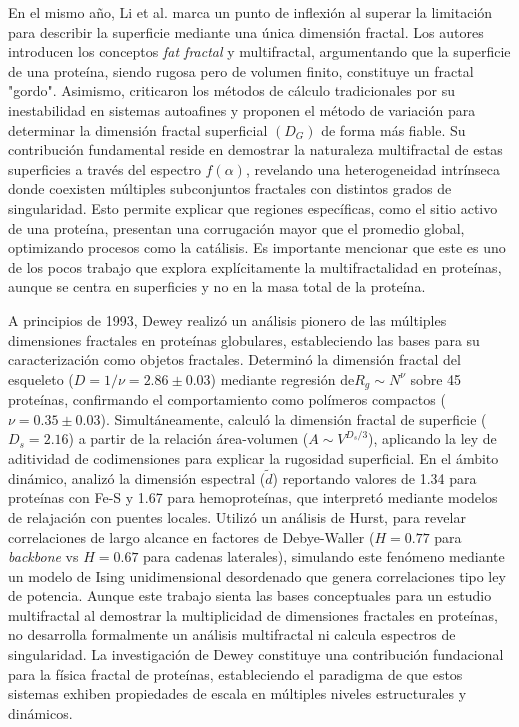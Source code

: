 En el mismo año, Li et al. \cite{HouqiangLi1991} marca un punto de inflexi\'{o}n al superar la limitaci\'{o}n para describir la superficie mediante una \'{u}nica dimensi\'{o}n fractal. Los autores introducen los conceptos \textit{fat fractal} y multifractal, argumentando que la superficie de una prote\'{i}na, siendo rugosa pero de volumen finito, constituye un fractal "gordo". Asimismo, criticaron los m\'{e}todos de c\'{a}lculo tradicionales por su inestabilidad en sistemas autoafines y proponen el m\'{e}todo de variaci\'{o}n para determinar la dimensi\'{o}n fractal superficial $(D_G)$ de forma m\'{a}s fiable. Su contribuci\'{o}n fundamental reside en demostrar la naturaleza multifractal de estas superficies a trav\'{e}s del espectro $f(\alpha)$, revelando una heterogeneidad intr\'{i}nseca donde coexisten m\'{u}ltiples subconjuntos fractales con distintos grados de singularidad. Esto permite explicar que regiones espec\'{i}ficas, como el sitio activo de una proteína, presentan una corrugaci\'{o}n mayor que el promedio global, optimizando procesos como la cat\'{a}lisis. Es importante mencionar que este es uno de los pocos trabajo que explora explícitamente la multifractalidad en proteínas, aunque se centra en superficies y no en la masa total de la proteína.


A principios de 1993, Dewey \cite{Dewey1993} realizó un análisis pionero de las múltiples dimensiones fractales en proteínas globulares, estableciendo las bases para su caracterización como objetos fractales. Determinó la dimensión fractal del esqueleto ($D = 1/\nu = 2.86 \pm 0.03$) mediante regresión de$R_g \sim N^\nu$ sobre 45 proteínas, confirmando el comportamiento como polímeros compactos ($\nu = 0.35 \pm 0.03$). Simultáneamente, calculó la dimensión fractal de superficie ($D_s = 2.16$) a partir de la relación área-volumen ($A \sim V^{D_s/3}$), aplicando la ley de aditividad de codimensiones para explicar la rugosidad superficial. En el ámbito dinámico, analizó la dimensión espectral ($\tilde{d}$) reportando valores de 1.34 para proteínas con Fe-S y 1.67 para hemoproteínas, que interpretó mediante modelos de relajación con puentes locales. Utilizó un análisis de Hurst, para revelar correlaciones de largo alcance en factores de Debye-Waller ($H = 0.77$ para \textit{backbone} vs $H = 0.67$ para cadenas laterales), simulando este fenómeno mediante un modelo de Ising unidimensional desordenado que genera correlaciones tipo ley de potencia. Aunque este trabajo sienta las bases conceptuales para un estudio multifractal al demostrar la multiplicidad de dimensiones fractales en proteínas, no desarrolla formalmente un análisis multifractal ni calcula espectros de singularidad. La investigación de Dewey constituye una contribución fundacional para la física fractal de proteínas, estableciendo el paradigma de que estos sistemas exhiben propiedades de escala en múltiples niveles estructurales y dinámicos.


